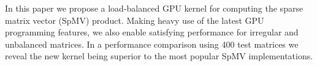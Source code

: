 In this paper we propose a load-balanced GPU kernel for computing the 
sparse matrix vector (SpMV) product.
Making heavy use of the latest GPU programming features, 
we also enable satisfying performance for irregular and unbalanced matrices.
In a performance comparison using 400 test matrices we reveal the 
new kernel being superior to the most popular SpMV implementations.
